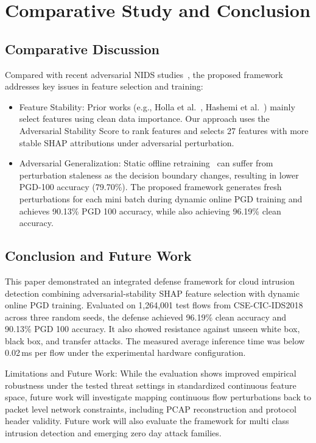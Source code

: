 \documentclass[conference]{IEEEtran}
\begin{document}
\section{Comparative Study and Conclusion}

\subsection{Comparative Discussion}
Compared with recent adversarial NIDS studies~\cite{ref4,ref11,ref13}, the proposed framework addresses key issues in feature selection and training:
\begin{itemize}
    \item Feature Stability: Prior works (e.g., Holla et al.~\cite{ref4}, Hashemi et al.~\cite{ref13}) mainly select features using clean data importance. Our approach uses the Adversarial Stability Score to rank features and selects 27 features with more stable SHAP attributions under adversarial perturbation.
    \item Adversarial Generalization: Static offline retraining~\cite{ref4} can suffer from perturbation staleness as the decision boundary changes, resulting in lower PGD-100 accuracy (79.70\%). The proposed framework generates fresh perturbations for each mini batch during dynamic online PGD training and achieves 90.13\% PGD 100 accuracy, while also achieving 96.19\% clean accuracy.
\end{itemize}

\subsection{Conclusion and Future Work}
This paper demonstrated an integrated defense framework for cloud intrusion detection combining adversarial-stability SHAP feature selection with dynamic online PGD training. Evaluated on 1,264,001 test flows from CSE-CIC-IDS2018 across three random seeds, the defense achieved 96.19\% clean accuracy and 90.13\% PGD 100 accuracy. It also showed resistance against unseen white box, black box, and transfer attacks. The measured average inference time was below 0.02\,ms per flow under the experimental hardware configuration.

Limitations and Future Work: While the evaluation shows improved empirical robustness under the tested threat settings in standardized continuous feature space, future work will investigate mapping continuous flow perturbations back to packet level network constraints, including PCAP reconstruction and protocol header validity. Future work will also evaluate the framework for multi class intrusion detection and emerging zero day attack families.
\end{document}
